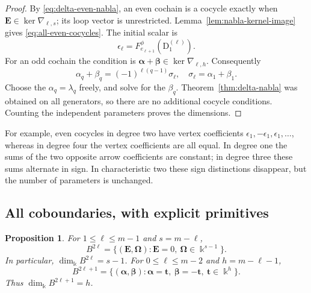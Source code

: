 \documentclass[a4paper,11pt,oneside,reqno]{amsart}
\newtheorem{proposition}[theorem]{Proposition}
\theoremstyle{definition}
\numberwithin{equation}{section}
\begin{document}
	\begin{proof}
		By \eqref{eq:delta-even-nabla}, an even cochain is a cocycle exactly
		when $\mathbf E\in\ker\nabla_{\ell,s}$; its loop vector is unrestricted.
		Lemma~\ref{lem:nabla-kernel-image} gives \eqref{eq:all-even-cocycles}.
		The initial scalar is
		\[
		\epsilon_\ell=F_{e_{\ell+1}}^\phi(\mathrm{D}_1^{(\ell)}).
		\]
		For an odd cochain the condition is
		$\boldsymbol\alpha+\boldsymbol\beta\in\ker\nabla_{\ell,h}$.
		Consequently
		\[
		\alpha_q+\beta_q=(-1)^{\ell(q-1)}\sigma_\ell,
		\quad
		\sigma_\ell=\alpha_1+\beta_1.
		\]
		Choose the $\alpha_q=\lambda_q$ freely, and solve for the $\beta_q$.
		Theorem~\ref{thm:delta-nabla} was obtained on all generators, so there
		are no additional cocycle conditions.  Counting the independent
		parameters proves the dimensions.
	\end{proof}
	
	For example, even cocycles in degree two have vertex coefficients
	$\epsilon_1,-\epsilon_1,\epsilon_1,\ldots$, whereas in degree four the
	vertex coefficients are all equal.  In degree one the sums of the two
	opposite arrow coefficients are constant; in degree three these sums
	alternate in sign.  In characteristic two these sign distinctions
	disappear, but the number of parameters is unchanged.
	
	\subsection{All coboundaries, with explicit primitives}
	
	\begin{proposition}\label{prop:all-coboundaries}
		For $1\leq\ell\leq m-1$ and $s=m-\ell$,
		\begin{equation}\label{eq:all-even-boundaries}
			B^{2\ell}
			=\{(\mathbf E,\boldsymbol\Omega):
			\mathbf E=0,\ \boldsymbol\Omega\in \Bbbk^{s-1}\}.
		\end{equation}
		In particular, $\dim_{\Bbbk}B^{2\ell}=s-1$.
		For $0\leq\ell\leq m-2$ and $h=m-\ell-1$,
		\begin{equation}\label{eq:all-odd-boundaries}
			B^{2\ell+1}
			=\{(\boldsymbol\alpha,\boldsymbol\beta):
			\boldsymbol\alpha=\mathbf t,\
			\boldsymbol\beta=-\mathbf t,\ \mathbf t\in \Bbbk^h\}.
		\end{equation}
		Thus $\dim_{\Bbbk}B^{2\ell+1}=h$.
	\end{proposition}
	
\end{document}
